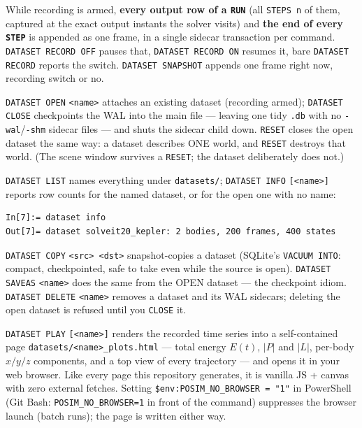 \documentclass[11pt]{article}
\newcommand{\kw}[1]{\texttt{\uppercase{#1}}}
\newcommand{\code}[1]{\texttt{#1}}
\begin{document}
While recording is armed, \textbf{every output row of a \kw{run}} (all
\code{STEPS n} of them, captured at the exact output instants the
solver visits) and \textbf{the end of every \kw{step}} is appended as
one frame, in a single sidecar transaction per command.
\kw{dataset record off} pauses that, \kw{dataset record on} resumes
it, bare \kw{dataset record} reports the switch. \kw{dataset snapshot}
appends one frame right now, recording switch or no.

\kw{dataset open} \code{<name>} attaches an existing dataset
(recording armed); \kw{dataset close} checkpoints the WAL into the
main file --- leaving one tidy \code{.db} with no
\code{-wal}/\code{-shm} sidecar files --- and shuts the sidecar child
down. \kw{reset} closes the open dataset the same way: a dataset
describes ONE world, and \kw{reset} destroys that world. (The scene
window survives a \kw{reset}; the dataset deliberately does not.)

\kw{dataset list} names everything under \code{datasets/};
\kw{dataset info} \code{[<name>]} reports row counts for the named
dataset, or for the open one with no name:

\begin{lstlisting}
In[7]:= dataset info
Out[7]= dataset solveit20_kepler: 2 bodies, 200 frames, 400 states
\end{lstlisting}

\kw{dataset copy} \code{<src> <dst>} snapshot-copies a dataset
(SQLite's \code{VACUUM INTO}: compact, checkpointed, safe to take even
while the source is open). \kw{dataset saveas} \code{<name>} does the
same from the OPEN dataset --- the checkpoint idiom.
\kw{dataset delete} \code{<name>} removes a dataset and its WAL
sidecars; deleting the open dataset is refused until you \kw{close}
it.

\kw{dataset play} \code{[<name>]} renders the recorded time series
into a self-contained page \code{datasets/<name>\_plots.html} ---
total energy $E(t)$, $|P|$ and $|L|$, per-body $x/y/z$ components, and
a top view of every trajectory --- and opens it in your web browser.
Like every page this repository generates, it is vanilla JS + canvas
with zero external fetches. Setting
\code{\$env:POSIM\_NO\_BROWSER = "1"} in PowerShell (Git Bash:
\code{POSIM\_NO\_BROWSER=1} in front of the command) suppresses the
browser launch (batch runs); the page is written either way.
\end{document}
